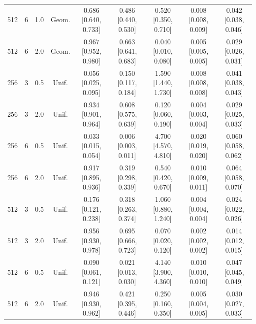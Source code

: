 \begin{table}[htbp]
\begin{tabular}{ccccccccc}
512 & 6 & 1.0 & Geom. & 0.686 [0.640, 0.733] & 0.486 [0.440, 0.530] & 0.520 [0.350, 0.710] & 0.008 [0.008, 0.009] & 0.042 [0.038, 0.046] \\
512 & 6 & 2.0 & Geom. & 0.967 [0.952, 0.980] & 0.663 [0.641, 0.683] & 0.040 [0.010, 0.080] & 0.005 [0.005, 0.005] & 0.029 [0.026, 0.031] \\
\midrule
256 & 3 & 0.5 & Unif. & 0.056 [0.025, 0.095] & 0.150 [0.117, 0.184] & 1.590 [1.440, 1.730] & 0.008 [0.008, 0.008] & 0.041 [0.038, 0.043] \\
256 & 3 & 2.0 & Unif. & 0.934 [0.901, 0.964] & 0.608 [0.575, 0.639] & 0.120 [0.060, 0.190] & 0.004 [0.003, 0.004] & 0.029 [0.025, 0.033] \\
256 & 6 & 0.5 & Unif. & 0.033 [0.015, 0.054] & 0.006 [0.003, 0.011] & 4.700 [4.570, 4.810] & 0.020 [0.019, 0.020] & 0.060 [0.058, 0.062] \\
256 & 6 & 2.0 & Unif. & 0.917 [0.895, 0.936] & 0.319 [0.298, 0.339] & 0.540 [0.420, 0.670] & 0.010 [0.009, 0.011] & 0.064 [0.058, 0.070] \\
\midrule
512 & 3 & 0.5 & Unif. & 0.176 [0.121, 0.238] & 0.318 [0.263, 0.374] & 1.060 [0.880, 1.240] & 0.004 [0.004, 0.004] & 0.024 [0.022, 0.026] \\
512 & 3 & 2.0 & Unif. & 0.956 [0.930, 0.978] & 0.695 [0.666, 0.723] & 0.070 [0.020, 0.120] & 0.002 [0.002, 0.002] & 0.014 [0.012, 0.015] \\
512 & 6 & 0.5 & Unif. & 0.090 [0.061, 0.121] & 0.021 [0.013, 0.030] & 4.140 [3.900, 4.360] & 0.010 [0.010, 0.010] & 0.047 [0.045, 0.049] \\
512 & 6 & 2.0 & Unif. & 0.946 [0.930, 0.962] & 0.421 [0.395, 0.446] & 0.250 [0.160, 0.350] & 0.005 [0.004, 0.005] & 0.030 [0.027, 0.033] \\
\bottomrule
\end{tabular}
\end{table}
